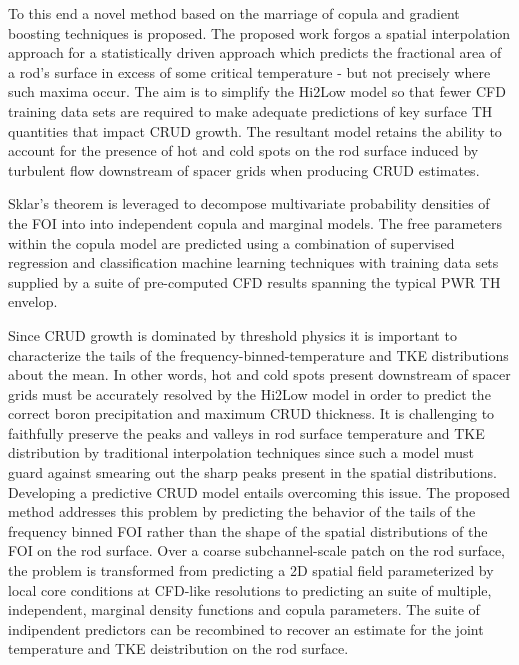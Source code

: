 To this end a novel method based on the marriage of copula and gradient
boosting techniques is proposed.  The proposed work forgos a spatial
interpolation approach for a statistically driven approach which predicts the
fractional area of a rod's surface in excess of some critical temperature - but
not precisely where such maxima occur.  The aim is to simplify the Hi2Low model
so that fewer CFD training data sets are required to make adequate predictions
of key surface TH quantities that impact CRUD growth.  The resultant model
retains the ability to account for the presence of hot and cold spots on the rod surface induced by
turbulent flow downstream of spacer grids when producing CRUD estimates.

Sklar's theorem is leveraged to decompose multivariate probability
densities of the FOI into into independent copula and marginal models. The free parameters
within the copula model are predicted using a combination of supervised
regression and classification machine learning techniques with training data
sets supplied by a suite of pre-computed CFD results spanning the typical PWR TH
envelop. 

Since CRUD growth is dominated by threshold physics
it is important to characterize the tails of the
frequency-binned-temperature and TKE distributions about the mean.  In other
words, hot and cold spots present downstream of spacer grids must be accurately
resolved by the Hi2Low model in order to predict the correct boron
precipitation and maximum CRUD thickness.
It is challenging to faithfully
preserve the peaks and valleys in rod surface temperature and TKE distribution
by traditional interpolation techniques since such a model must guard against
smearing out the sharp peaks present in the spatial distributions.  Developing
a predictive CRUD model entails overcoming this issue. The proposed method
addresses this problem by predicting the behavior of the tails of the frequency
binned FOI rather than the shape of the spatial distributions of the FOI on
the rod surface.  Over a coarse subchannel-scale patch on the rod surface, the
problem is transformed from predicting a 2D spatial field parameterized by local core conditions at CFD-like resolutions to
predicting an suite of multiple, independent, marginal density functions and copula parameters.  The suite of indipendent predictors can be recombined to recover an estimate for the joint temperature and TKE deistribution on the rod surface.
